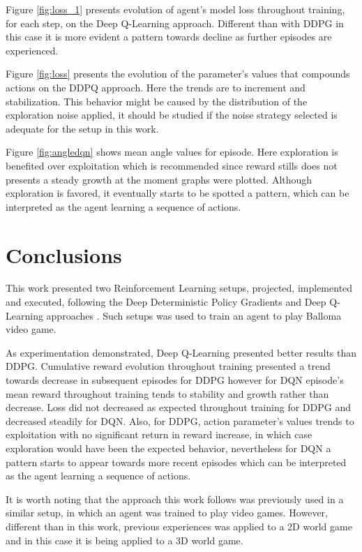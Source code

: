\documentclass[peerreview,onecolumn]{IEEEtran}
\begin{document}
	Figure \ref{fig:loss_1} presents evolution of agent's model loss throughout training, for each step, on the Deep Q-Learning approach. Different than with DDPG in this case it is more evident a pattern towards decline as further episodes are experienced.
	
	
	Figure \ref{fig:loss} presents the evolution of the parameter's values that compounds actions on the DDPQ approach. Here the trends are to increment and stabilization. This behavior might be caused by the distribution of the exploration noise applied, it should be studied if the noise strategy selected is adequate for the setup in this work.
	
	Figure \ref{fig:angledqn} shows mean angle values for episode. Here exploration is benefited over exploitation which is recommended since reward stills does not presents a steady growth at the moment graphs were plotted. Although exploration is favored, it eventually starts to be spotted a pattern, which can be interpreted as the agent learning a sequence of actions.
	
	\section{Conclusions}
	
	This work presented two Reinforcement Learning setups, projected, implemented and executed, following the Deep Deterministic Policy Gradients \cite{ddpg_2015} and Deep Q-Learning approaches \cite{replay_buffer_2015}. Such setups was used to train an agent to play Balloma video game. 
	
	As experimentation demonstrated, Deep Q-Learning presented better results than DDPG. Cumulative reward evolution throughout training presented a trend towards decrease in subsequent episodes for DDPG however for DQN episode's mean reward throughout training tends to stability and growth rather than decrease. Loss did not decreased as expected throughout training for DDPG and decreased steadily for DQN. Also, for DDPG, action parameter's values trends to exploitation with no significant return in reward increase, in which case exploration would have been the expected behavior, nevertheless for DQN a pattern starts to appear towards more recent episodes which can be interpreted as the agent learning a sequence of actions.
	
	It is worth noting that the approach this work follows was previously used in a similar setup, in which an agent was trained to play video games. However, different than in this work, previous experiences was applied to a 2D world game and in this case it is being applied to a 3D world game.
	
\end{document}

